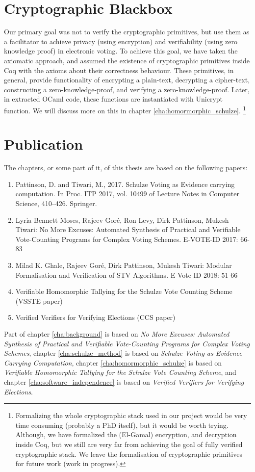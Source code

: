 \section{Cryptographic Blackbox}
Our primary goal was not to verify the cryptographic primitives, but use them as a 
facilitator to achieve privacy (using encryption) and verifiability (using zero knowledge proof) in electronic voting. 
To achieve this goal, we have 
taken the axiomatic approach, and assumed the existence of cryptographic primitives 
inside Coq with the axioms about their correctness behaviour. These primitives, in general, provide functionality 
of encrypting a plain-text, decrypting a cipher-text, constructing a zero-knowledge-proof, 
and verifying a zero-knowledge-proof. Later, in extracted OCaml code, these functions are instantiated 
with Unicrypt\citep{LocherH14} function.  We will discuss more on this in chapter
\ref{cha:homormorphic_schulze}.
\footnote{Formalizing the whole cryptographic stack used in our 
project would be very time consuming (probably a PhD itself), but it would be worth trying. 
Although, we have formalized the (El-Gamal) encryption, and decryption inside Coq, but we still 
are very far from achieving the goal of fully verified cryptographic stack.  We leave the formalisation 
of cryptographic primitives for future work (work in progress).}



\section{Publication}
 The chapters, or some part of it,  of this thesis are based on the following papers:
	\begin{enumerate}
	\item Pattinson, D. and Tiwari, M., 2017. Schulze Voting as Evidence carrying computation. In Proc. 
	ITP 2017, vol. 10499 of Lecture Notes in Computer Science, 410–426. Springer. 
	\item Lyria Bennett Moses, Rajeev Goré, Ron Levy, Dirk Pattinson, Mukesh Tiwari:
	No More Excuses: Automated Synthesis of Practical and Verifiable Vote-Counting Programs for Complex 
	Voting 	Schemes. E-VOTE-ID 2017: 66-83
	\item Milad K. Ghale, Rajeev Goré, Dirk Pattinson, Mukesh Tiwari:
	Modular Formalisation and Verification of STV Algorithms. E-Vote-ID 2018: 51-66
	\item Verifiable Homomorphic Tallying for the 
 		Schulze Vote Counting Scheme (VSSTE paper)
	\item Verified Verifiers for Verifying Elections (CCS paper)
	\end{enumerate}
 \noindent
 Part of chapter \ref{cha:background} is based on \textit{No More Excuses: Automated Synthesis of Practical 
 and Verifiable Vote-Counting Programs for Complex Voting  Schemes},
 chapter \ref{cha:schulze_method} is based on \textit{Schulze Voting as Evidence Carrying Computation},
 chapter \ref{cha:homormorphic_schulze} is based on \textit{Verifiable Homomorphic Tallying for the 
 Schulze Vote Counting Scheme}, and chapter
 \ref{cha:software_independence} is based on \textit{ Verified Verifiers for Verifying Elections}.




